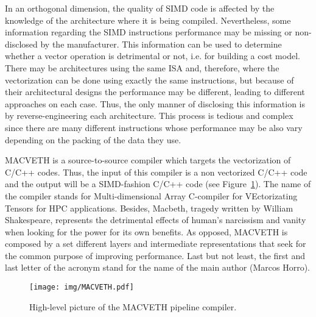 In an orthogonal dimension, the quality of SIMD code is affected by the 
knowledge of the architecture where it is being compiled. Nevertheless, some 
information regarding the SIMD instructions performance may be missing or 
non-disclosed by the manufacturer. This information can be used to determine 
whether a vector operation is detrimental or not, i.e. for building a cost 
model. There may be architectures using the same ISA and, therefore, where the 
vectorization can be done using exactly the same instructions, but because of 
their architectural designs the performance may be different, leading to 
different approaches on each case. Thus, the only manner of disclosing this 
information is by reverse-engineering each architecture. This process is 
tedious and complex since there are many different instructions whose 
performance may be also vary depending on the packing of the data they use.


MACVETH is a source-to-source compiler which targets the vectorization of C/C++
codes. Thus, the input of this compiler is a non vectorized C/C++ code and the
output will be a SIMD-fashion C/C++ code (see Figure~\ref{fig:MACVETHarch}).
The name of the compiler stands for Multi-dimensional Array C-compiler for
VEctorizating Tensors for HPC applications. Besides, Macbeth, tragedy
written by William Shakespeare, represents the detrimental effects of human's
narcissism and vanity when looking for the power for its own benefits. As
opposed, MACVETH is composed by a set different layers and intermediate
representations that seek for the common purpose of improving performance. Last
but not least, the first and last letter of the acronym stand for the name of
the main author (Marcos Horro).

\begin{figure}
	\centering
	\texttt{[image: img/MACVETH.pdf]}
	\caption{High-level picture of the MACVETH pipeline compiler.}
	\label{fig:MACVETHarch}
\end{figure}

